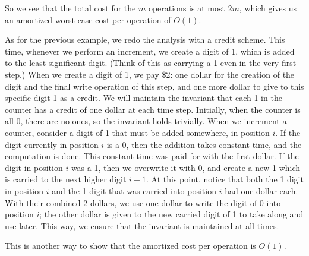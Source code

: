So we see that the total cost for the $m$ operations is at most $2m$,
which gives us an amortized worst-case cost per operation of $O(1)$.

\smallskip

As for the previous example, we redo the analysis with a credit scheme.
This time, whenever we perform an increment,
we create a digit of 1, which is added to the least significant digit.
(Think of this as carrying a 1 even in the very first step.)
When we create a digit of 1, we pay \$2:
one dollar for the creation of the digit and the final write operation of this
step, and one more dollar to give to this specific digit 1 as a credit.
We will maintain the invariant that each 1 in the counter has a credit
of one dollar at each time step.
Initially, when the counter is all 0,
there are no ones, so the invariant holds trivially.
When we increment a counter, consider a digit of 1 that must be
added somewhere, in position $i$.
If the digit currently in position $i$ is a 0,
then the addition takes constant time, and the computation is done. 
This constant time was paid for with the first dollar. 
If the digit in position $i$ was a 1, then we overwrite it with 0,
and create a new 1 which is carried to the next higher digit $i+1$.
At this point, notice that both the 1 digit in position $i$ and the 1
digit that was carried into position $i$ had one dollar each.
With their combined 2 dollars, we use one dollar to write the digit of 0 into
position $i$;
the other dollar is given to the new carried digit of 1 to take
along and use later.
This way, we ensure that the invariant is maintained at all times.

This is another way to show that the amortized cost per 
operation is $O(1)$.
